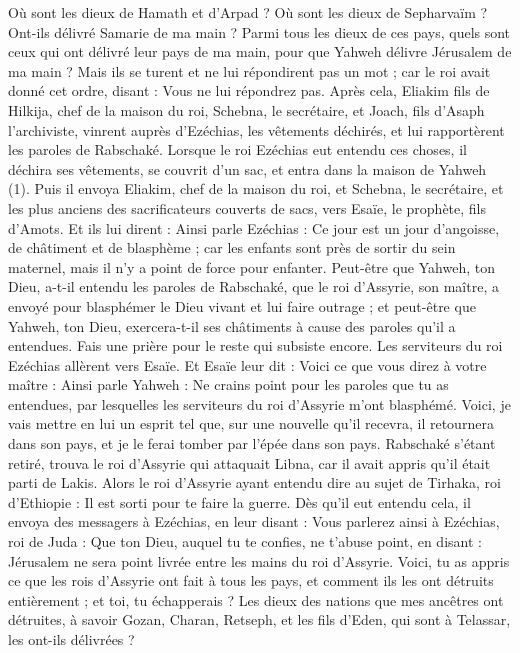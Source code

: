 \begin{multicols}{2}
Où sont les dieux de Hamath et d'Arpad ? Où sont les dieux de Sepharvaïm ? Ont-ils délivré Samarie de ma main ?
Parmi tous les dieux de ces pays, quels sont ceux qui ont délivré leur pays de ma main, pour que Yahweh délivre Jérusalem de ma main ?
Mais ils se turent et ne lui répondirent pas un mot ; car le roi avait donné cet ordre, disant : Vous ne lui répondrez pas.
Après cela, Eliakim fils de Hilkija, chef de la maison du roi, Schebna, le secrétaire, et Joach, fils d'Asaph l’archiviste, vinrent auprès d’Ezéchias, les vêtements déchirés, et lui rapportèrent les paroles de Rabschaké.
\VerseOne{}Lorsque le roi Ezéchias eut entendu ces choses, il déchira ses vêtements, se couvrit d'un sac, et entra dans la maison de Yahweh (1).
Puis il envoya Eliakim, chef de la maison du roi, et Schebna, le secrétaire, et les plus anciens des sacrificateurs couverts de sacs, vers Esaïe, le prophète, fils d'Amots.
Et ils lui dirent : Ainsi parle Ezéchias : Ce jour est un jour d'angoisse, de châtiment et de blasphème ; car les enfants sont près de sortir du sein maternel, mais il n'y a point de force pour enfanter.
Peut-être que Yahweh, ton Dieu, a-t-il entendu les paroles de Rabschaké, que le roi d’Assyrie, son maître, a envoyé pour blasphémer le Dieu vivant et lui faire outrage ; et peut-être que Yahweh, ton Dieu, exercera-t-il ses châtiments à cause des paroles qu’il a entendues. Fais une prière pour le reste qui subsiste encore.
Les serviteurs du roi Ezéchias allèrent vers Esaïe.
Et Esaïe leur dit : Voici ce que vous direz à votre maître : Ainsi parle Yahweh : Ne crains point pour les paroles que tu as entendues, par lesquelles les serviteurs du roi d’Assyrie m'ont blasphémé.
Voici, je vais mettre en lui un esprit tel que, sur une nouvelle qu’il recevra, il retournera dans son pays, et je le ferai tomber par l'épée dans son pays.
Rabschaké s’étant retiré, trouva le roi d’Assyrie qui attaquait Libna, car il avait appris qu'il était parti de Lakis.
Alors le roi d’Assyrie ayant entendu dire au sujet de Tirhaka, roi d'Ethiopie : Il est sorti pour te faire la guerre. Dès qu’il eut entendu cela, il envoya des messagers à Ezéchias, en leur disant :
Vous parlerez ainsi à Ezéchias, roi de Juda : Que ton Dieu, auquel tu te confies, ne t'abuse point, en disant : Jérusalem ne sera point livrée entre les mains du roi d’Assyrie.
Voici, tu as appris ce que les rois d’Assyrie ont fait à tous les pays, et comment ils les ont détruits entièrement ; et toi, tu échapperais ?
Les dieux des nations que mes ancêtres ont détruites, à savoir Gozan, Charan, Retseph, et les fils d’Eden, qui sont à Telassar, les ont-ils délivrées ?

\end{multicols}
